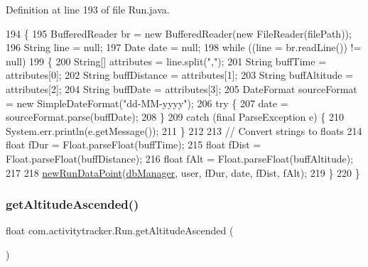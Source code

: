Definition at line 193 of file Run.\+java.


\begin{DoxyCode}
194                                                       \{
195         BufferedReader br = \textcolor{keyword}{new} BufferedReader(\textcolor{keyword}{new} FileReader(filePath));
196         String line = null;
197         Date date = null;
198         \textcolor{keywordflow}{while} ((line = br.readLine()) != null)  
199         \{
200             String[] attributes = line.split(\textcolor{stringliteral}{","});
201             String buffTime = attributes[0];
202             String buffDistance = attributes[1];
203             String buffAltitude = attributes[2];
204             String buffDate = attributes[3];
205             DateFormat sourceFormat = \textcolor{keyword}{new} SimpleDateFormat(\textcolor{stringliteral}{"dd-MM-yyyy"});
206             \textcolor{keywordflow}{try} \{
207                 date = sourceFormat.parse(buffDate);
208             \}
209             \textcolor{keywordflow}{catch} (\textcolor{keyword}{final} ParseException e) \{
210                 System.err.println(e.getMessage());
211             \}
212 
213             \textcolor{comment}{// Convert strings to floats}
214             \textcolor{keywordtype}{float} fDur = Float.parseFloat(buffTime);
215             \textcolor{keywordtype}{float} fDist = Float.parseFloat(buffDistance);
216             \textcolor{keywordtype}{float} fAlt = Float.parseFloat(buffAltitude);
217 
218             \mbox{\hyperlink{classcom_1_1activitytracker_1_1_run_a5dea6f1860431103d553ce770382afe0}{newRunDataPoint}}(\mbox{\hyperlink{classcom_1_1activitytracker_1_1_run_ab90e32eda9f4c671ae3575f971edca6b}{dbManager}}, user, fDur, date, fDist, fAlt);
219         \} 
220     \}
\end{DoxyCode}
\mbox{\label{classcom_1_1activitytracker_1_1_run_a9365647310eee181b15a85eaf6b95e93}} 
\subsubsection{\texorpdfstring{get\+Altitude\+Ascended()}{getAltitudeAscended()}}
{\footnotesize\ttfamily float com.\+activitytracker.\+Run.\+get\+Altitude\+Ascended (\begin{DoxyParamCaption}{ }\end{DoxyParamCaption})}

